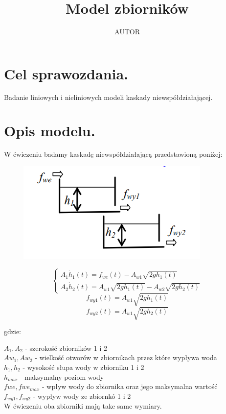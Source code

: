 \documentclass{article}
\title{Model zbiorników}
\author{AUTOR}
\date{}
\begin{document}
\maketitle

\section{Cel sprawozdania.}
Badanie liniowych i nieliniowych modeli kaskady niewspółdziałającej.
\section{Opis modelu.}
W ćwiczeniu badamy kaskadę niewspółdziałającą przedstawioną poniżej:

\begin{figure}[h]
    \centering
    \includegraphics{obrazek_zbiornikow.png}
    \label{fig:my_label}
\end{figure}
$$
\begin{cases}
    A_1\dot h_{1}(t)=f_{we}(t)-A_{w1}\sqrt{2gh_1(t)}\\
    A_2\dot h_{2}(t)=A_{w1}\sqrt{2gh_1(t)}-A_{w2}\sqrt{2gh_2(t)}
  \end{cases}
$$
$$
f_{wy1}(t)=A_{w1}\sqrt{2gh_1(t)}
$$
$$
f_{wy2}(t)=A_{w1}\sqrt{2gh_2(t)}
$$

\begin{flushleft}
gdzie:
\end{flushleft}
$ A_1, A_2 $ - szerokość zbiorników 1 i 2\\
$Aw_1, Aw_2$ - wielkość otworów w zbiornikach przez które wypływa woda\\
$h_1, h_2$ - wysokość słupa wody w zbiorniku 1 i 2\\
$h_{max}$ - maksymalny poziom wody \\
$fwe, fwe_{max}$ - wpływ wody do zbiornika oraz jego maksymalna wartość\\
$f_{wy1}, f_{wy2}$ - wypływ wody ze zbiornkó 1 i 2 \\
W ćwiczeniu oba zbiorniki mają take same wymiary.
\end{document}
